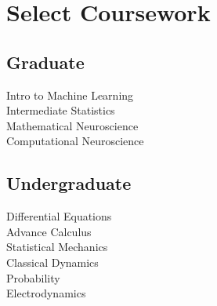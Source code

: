 \documentclass[]{deedy-resume-openfont}
\begin{document}
\begin{minipage}[t]{0.33\textwidth}


\section{Select Coursework}
\subsection{Graduate}
\vspace{1pt}
\regdescript
Intro to Machine Learning \\
Intermediate Statistics \\
Mathematical Neuroscience\\
Computational Neuroscience\\
\sectionsep

\subsection{Undergraduate}
 \vspace{1pt}
 \regdescript
 Differential Equations\\
 Advance Calculus \\
 Statistical Mechanics\\
 Classical Dynamics\\
 Probability\\
 Electrodynamics\\
 

\sectionsep



\end{minipage}
\end{document}
